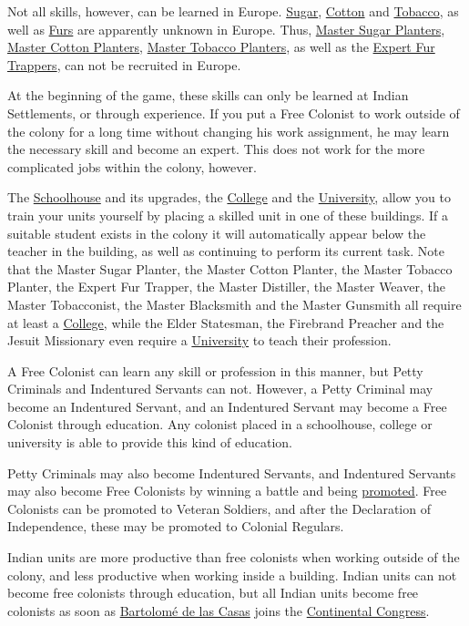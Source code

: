 \documentclass[12pt]{book}
\begin{document}
Not all skills, however, can be learned in Europe.
\hyperlink{Sugar}{Sugar}, \hyperlink{Cotton}{Cotton} and
\hyperlink{Tobacco}{Tobacco}, as well as \hyperlink{Furs}{Furs} are
apparently unknown in Europe. Thus, \hyperlink{Master Sugar
Planter}{Master Sugar Planters}, \hyperlink{Master Cotton
Planter}{Master Cotton Planters}, \hyperlink{Master Tobacco
Planter}{Master Tobacco Planters}, as well as the \hyperlink{Expert
Fur Trapper}{Expert Fur Trappers}, can not be recruited in Europe.

At the beginning of the game, these skills can only be learned at
Indian Settlements, or through experience. If you put a Free Colonist
to work outside of the colony for a long time without changing his
work assignment, he may learn the necessary skill and become an
expert. This does not work for the more complicated jobs within the
colony, however. 

The \hyperlink{Schoolhouse}{Schoolhouse} and its upgrades, the
\hyperlink{College}{College} and the
\hyperlink{University}{University}, allow you to train your units
yourself by placing a skilled unit in one of these buildings.  If a
suitable student exists in the colony it will automatically appear
below the teacher in the building, as well as continuing to perform
its current task.  Note that the Master Sugar Planter, the Master
Cotton Planter, the Master Tobacco Planter, the Expert Fur Trapper,
the Master Distiller, the Master Weaver, the Master Tobacconist, the
Master Blacksmith and the Master Gunsmith all require at least a
\hyperlink{College}{College}, while the Elder Statesman, the Firebrand
Preacher and the Jesuit Missionary even require a
\hyperlink{University}{University} to teach their profession.

A Free Colonist can learn any skill or profession in this manner, but
Petty Criminals and Indentured Servants can not.  However, a Petty
Criminal may become an Indentured Servant, and an Indentured Servant
may become a Free Colonist through education. Any colonist placed in a
schoolhouse, college or university is able to provide this kind of
education.

Petty Criminals may also become Indentured Servants, and Indentured
Servants may also become Free Colonists by winning a battle and being
\hyperlink{promotion}{promoted}. Free Colonists can be promoted to
Veteran Soldiers, and after the Declaration of Independence, these may
be promoted to Colonial Regulars.

Indian units are more productive than free colonists when working
outside of the colony, and less productive when working inside a
building. Indian units can not become free colonists through
education, but all Indian units become free colonists as soon as
\hyperlink{Bartolome de las Casas}{Bartolom\'e de las Casas} joins
the \hyperlink{Continental Congress}{Continental Congress}.
\end{document}
